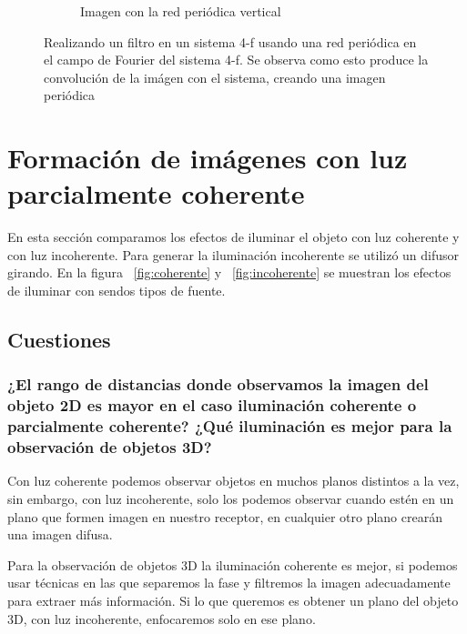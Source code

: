 \documentclass{./packages/optica-article}
\begin{document}
\begin{figure}[hptb]
\begin{center}
\begin{subfigure}[t]{0.3\textwidth}
			\caption{Imagen con la red periódica vertical}
			\label{fig:filtrado:talbot:3}
		\end{subfigure}
		\caption{Realizando un filtro en un sistema 4-f usando una red periódica en el campo de Fourier del sistema 4-f. Se observa como esto produce la convolución de la imágen con el sistema, creando una imagen periódica}
		\label{fig:filtrado:all}
	\end{center}
\end{figure}


\section{Formación de imágenes con luz parcialmente coherente}

En esta sección comparamos los efectos de iluminar el objeto con luz coherente y con luz incoherente. Para generar la iluminación incoherente se utilizó un difusor girando. En la figura ~\ref{fig:coherente} y ~\ref{fig:incoherente} se muestran los efectos de iluminar con sendos tipos de fuente.

\subsection{Cuestiones}
\subsubsection{¿El rango de distancias donde observamos la imagen del objeto 2D es mayor en el caso iluminación coherente o parcialmente coherente? ¿Qué iluminación es mejor para la observación de objetos 3D?}

Con luz coherente podemos observar objetos en muchos planos distintos a la vez, sin embargo, con luz incoherente, solo los podemos observar cuando estén en un plano que formen imagen en nuestro receptor, en cualquier otro plano crearán una imagen difusa.

Para la observación de objetos 3D la iluminación coherente es mejor, si podemos usar técnicas en las que separemos la fase y filtremos la imagen adecuadamente para extraer más información. Si lo que queremos es obtener un plano del objeto 3D, con luz incoherente, enfocaremos solo en ese plano.
\end{document}
